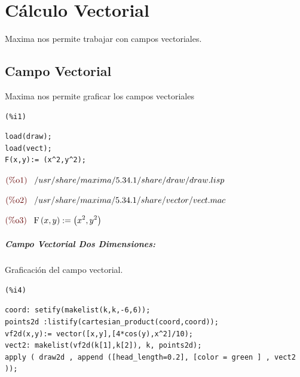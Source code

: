 \documentclass[12pt]{article}
\begin{document}
\section{Cálculo Vectorial}
Maxima nos permite trabajar con campos vectoriales.
\subsection{Campo Vectorial}
Maxima nos permite graficar los campos vectoriales

\noindent
\begin{minipage}[t]{8ex}{\color{red}\bf
\begin{verbatim}
(%i1) 
\end{verbatim}}
\end{minipage}
\begin{minipage}[t]{\textwidth}{\color{blue}
\begin{verbatim}
load(draw);
load(vect);
F(x,y):= (x^2,y^2);
\end{verbatim}}
\end{minipage}
\begin{math}\displaystyle
\parbox{8ex}{\color{labelcolor}(\%o1) }
/usr/share/maxima/5.34.1/share/draw/draw.lisp
\end{math}

\begin{math}\displaystyle
\parbox{8ex}{\color{labelcolor}(\%o2) }
/usr/share/maxima/5.34.1/share/vector/vect.mac
\end{math}

\begin{math}\displaystyle
\parbox{8ex}{\color{labelcolor}(\%o3) }
\mathrm{F}\left( x,y\right) :=\left( {x}^{2},{y}^{2}\right) 
\end{math}


\subparagraph{Campo Vectorial Dos Dimensiones:}
Graficación del campo vectorial.

\noindent
\begin{minipage}[t]{8ex}{\color{red}\bf
\begin{verbatim}
(%i4) 
\end{verbatim}}
\end{minipage}
\begin{minipage}[t]{\textwidth}{\color{blue}
\begin{verbatim}
coord: setify(makelist(k,k,-6,6));
points2d :listify(cartesian_product(coord,coord));
vf2d(x,y):= vector([x,y],[4*cos(y),x^2]/10);
vect2: makelist(vf2d(k[1],k[2]), k, points2d);
apply ( draw2d , append ([head_length=0.2], [color = green ] , vect2 ));
\end{verbatim}}
\end{minipage}
\end{document}
